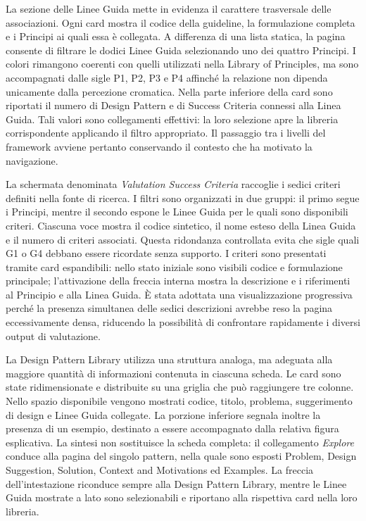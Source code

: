 La sezione delle Linee Guida mette in evidenza il carattere trasversale delle associazioni. Ogni card mostra il codice della guideline, la formulazione completa e i Principi ai quali essa è collegata. A differenza di una lista statica, la pagina consente di filtrare le dodici Linee Guida selezionando uno dei quattro Principi. I colori rimangono coerenti con quelli utilizzati nella Library of Principles, ma sono accompagnati dalle sigle P1, P2, P3 e P4 affinché la relazione non dipenda unicamente dalla percezione cromatica. Nella parte inferiore della card sono riportati il numero di Design Pattern e di Success Criteria connessi alla Linea Guida. Tali valori sono collegamenti effettivi: la loro selezione apre la libreria corrispondente applicando il filtro appropriato. Il passaggio tra i livelli del framework avviene pertanto conservando il contesto che ha motivato la navigazione.

La schermata denominata \emph{Valutation Success Criteria} raccoglie i sedici criteri definiti nella fonte di ricerca. I filtri sono organizzati in due gruppi: il primo segue i Principi, mentre il secondo espone le Linee Guida per le quali sono disponibili criteri. Ciascuna voce mostra il codice sintetico, il nome esteso della Linea Guida e il numero di criteri associati. Questa ridondanza controllata evita che sigle quali G1 o G4 debbano essere ricordate senza supporto. I criteri sono presentati tramite card espandibili: nello stato iniziale sono visibili codice e formulazione principale; l'attivazione della freccia interna mostra la descrizione e i riferimenti al Principio e alla Linea Guida. È stata adottata una visualizzazione progressiva perché la presenza simultanea delle sedici descrizioni avrebbe reso la pagina eccessivamente densa, riducendo la possibilità di confrontare rapidamente i diversi output di valutazione.

La Design Pattern Library utilizza una struttura analoga, ma adeguata alla maggiore quantità di informazioni contenuta in ciascuna scheda. Le card sono state ridimensionate e distribuite su una griglia che può raggiungere tre colonne. Nello spazio disponibile vengono mostrati codice, titolo, problema, suggerimento di design e Linee Guida collegate. La porzione inferiore segnala inoltre la presenza di un esempio, destinato a essere accompagnato dalla relativa figura esplicativa. La sintesi non sostituisce la scheda completa: il collegamento \emph{Explore} conduce alla pagina del singolo pattern, nella quale sono esposti Problem, Design Suggestion, Solution, Context and Motivations ed Examples. La freccia dell'intestazione riconduce sempre alla Design Pattern Library, mentre le Linee Guida mostrate a lato sono selezionabili e riportano alla rispettiva card nella loro libreria.

